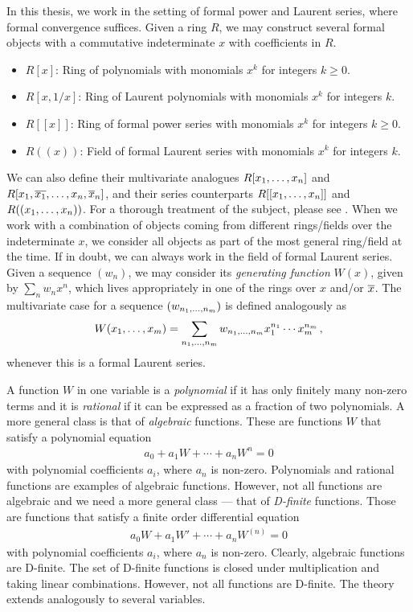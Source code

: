 In this thesis, we work in the setting of formal power and Laurent series, where formal convergence suffices. Given a ring $R$, we may construct several formal objects with a commutative indeterminate $x$ with coefficients in $R$.
\begin{itemize}
	\item $R[x]$: Ring of polynomials with monomials $x^k$ for integers $k\ge 0$.
	\item $R[x,1/x]$: Ring of Laurent polynomials with monomials $x^k$ for integers $k$.
	\item $R[[x]]$: Ring of formal power series with monomials $x^k$ for integers $k \ge 0$.
	\item $R((x))$: Field of formal Laurent series with monomials $x^k$ for integers $k$.
\end{itemize}
We can also define their multivariate analogues $R[x_1,\ldots,x_n]$ and $R[x_1,\overline{x_1},\ldots,x_n,\overline{x}_n]$, and their series counterparts $R[[x_1,\ldots,x_n]]$ and $R((x_1,\ldots,x_n))$. For a thorough treatment of the subject, please see \cite{monforte2013formal}. When we work with a combination of objects coming from different rings/fields over the indeterminate $x$, we consider all objects as part of the most general ring/field at the time. If in doubt, we can always work in the field of formal Laurent series. Given a sequence $(w_n)$, we may consider its \textit{generating function} $W(x)$, given by $\sum_{n} w_n x^n$, which lives appropriately in one of the rings over $x$ and/or $\overline{x}$. The multivariate case for a sequence $(w_{n_1,\ldots, n_m})$ is defined analogously as
\begin{align}
	W(x_1,\ldots, x_m) = \sum_{n_1,\ldots, n_m} w_{n_1,\ldots, n_m} x_1^{n_1}\cdots x_m^{n_m}\,,
\end{align}
whenever this is a formal Laurent series. 

A function $W$ in one variable is a \textit{polynomial} if it has only finitely many non-zero terms and it is \textit{rational} if it can be expressed as a fraction of two polynomials. A more general class is that of \textit{algebraic} functions. These are functions $W$ that satisfy a polynomial equation
\begin{align}
	a_0 + a_1 W + \cdots + a_n W^n = 0
\end{align}
with polynomial coefficients $a_i$, where $a_n$ is non-zero. Polynomials and rational functions are examples of algebraic functions. However, not all functions are algebraic and we need a more general class --- that of \textit{D-finite} functions. Those are functions that satisfy a finite order differential equation
\begin{align}
	a_0 W + a_1 W'  + \cdots + a_n W^{(n)} = 0
\end{align}
with polynomial coefficients $a_i$, where $a_n$ is non-zero. Clearly, algebraic functions are D-finite. The set of D-finite functions is closed under multiplication and taking linear combinations. However, not all functions are D-finite. The theory extends analogously to several variables.

